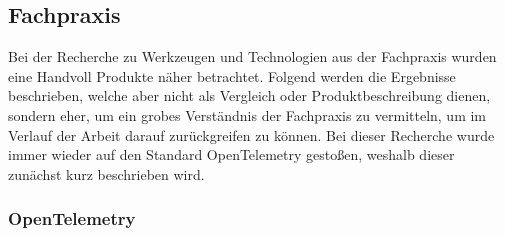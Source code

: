 %
%

\subsection{Fachpraxis}

Bei der Recherche zu Werkzeugen und Technologien aus der Fachpraxis wurden eine Handvoll Produkte näher betrachtet. Folgend werden die Ergebnisse beschrieben, welche aber nicht als Vergleich oder Produktbeschreibung dienen, sondern eher, um ein grobes Verständnis der Fachpraxis zu vermitteln, um im Verlauf der Arbeit darauf zurückgreifen zu können. Bei dieser Recherche wurde immer wieder auf den Standard OpenTelemetry gestoßen, weshalb dieser zunächst kurz beschrieben wird.

\subsubsection{OpenTelemetry}

